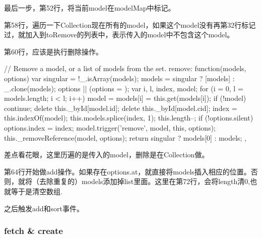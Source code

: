 最后一步，第52行，将当前model在modelMap中标记。

第58行，遍历一下Collection现在所有的model，如果这个model没有再第32行标记过，就加入到toRemove的列表中，表示传入的model中不包含这个model。

第60行，应该是执行删除操作。

\begin{JavaScript}
    // Remove a model, or a list of models from the set.
    remove: function(models, options) {
      var singular = !_.isArray(models);
      models = singular ? [models] : _.clone(models);
      options || (options = {});
      var i, l, index, model;
      for (i = 0, l = models.length; i < l; i++) {
        model = models[i] = this.get(models[i]);
        if (!model) continue;
        delete this._byId[model.id];
        delete this._byId[model.cid];
        index = this.indexOf(model);
        this.models.splice(index, 1);
        this.length--;
        if (!options.silent) {
          options.index = index;
          model.trigger('remove', model, this, options);
        }
        this._removeReference(model, options);
      }
      return singular ? models[0] : models;
    },
\end{JavaScript}

差点看花眼，这里历遍的是传入的model，删除是在Collection做。

第64行开始做add操作。如果存在options.at，就直接将models插入相应的位置。否则，就将（去除重复的）models添加掉list里面。这里在第72行，会将length清0,也就等于是清空数组.

之后触发add和sort事件。


\subsubsection{fetch \& create}

